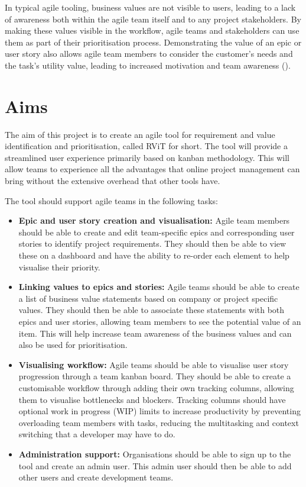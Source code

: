\documentclass[l4proj.tex]{subfiles}
\begin{document}
In typical agile tooling, business values are not visible to users, leading to a lack of awareness both within the agile team itself and to any project stakeholders. By making these values visible in the workflow, agile teams and stakeholders can use them as part of their prioritisation process. Demonstrating the value of an epic or user story also allows agile team members to consider the customer's needs and the task's utility value, leading to increased motivation and team awareness (\cite{Wigfield2000}).


\section{Aims}
The aim of this project is to create an agile tool for requirement and value identification and prioritisation, called RViT for short. The tool will provide a streamlined user experience primarily based on kanban methodology. This will allow teams to experience all the advantages that online project management can bring without the extensive overhead that other tools have.

The tool should support agile teams in the following tasks: 
\begin{itemize}
    \item \textbf{Epic and user story creation and visualisation:}
    Agile team members should be able to create and edit team-specific epics and corresponding user stories to identify project requirements. They should then be able to view these on a dashboard and have the ability to re-order each element to help visualise their priority.
    \item \textbf{Linking values to epics and stories:}
    Agile teams should be able to create a list of business value statements based on company or project specific values. They should then be able to associate these statements with both epics and user stories, allowing team members to see the potential value of an item. This will help increase team awareness of the business values and can also be used for prioritisation.
    \item \textbf{Visualising workflow:}
    Agile teams should be able to visualise user story progression through a team kanban board. They should be able to create a customisable workflow through adding their own tracking columns, allowing them to visualise bottlenecks and blockers. Tracking columns should have optional work in progress (WIP) limits to increase productivity by preventing overloading team members with tasks, reducing the multitasking and context switching that a developer may have to do. 
    \item \textbf{Administration support:}
    Organisations should be able to sign up to the tool and create an admin user. This admin user should then be able to add other users and create development teams.
\end{itemize}
\end{document}
